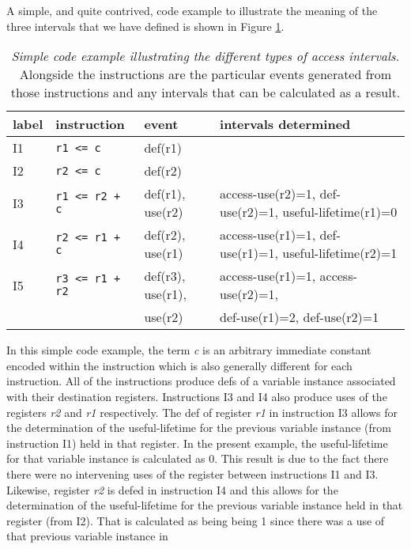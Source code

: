 \documentclass[10pt,dvips]{article}
\begin{document}
A simple, and quite contrived, 
code example to illustrate the meaning of the three
intervals that we have defined is shown in Figure \ref{tab:code1}.
%
\begin{table}
\begin{center}
\caption{{\em Simple code example illustrating the different types of
access intervals.}
Alongside the instructions are the particular events generated
from those instructions and any intervals that can be calculated
as a result.}
\label{tab:code1}
\vspace{+0.1in}
\begin{tabular}{l|l|l|l}
\hline 
label&instruction&event&intervals determined\\
\hline 
\hline 
I1&\verb"r1 <= c"&def(r1)& \\
\hline
I2&\verb"r2 <= c"&def(r2)& \\
\hline
I3&\verb"r1 <= r2 + c"&def(r1), use(r2)&
access-use(r2)=1, def-use(r2)=1, useful-lifetime(r1)=0\\
\hline
I4&\verb"r2 <= r1 + c"&def(r2), use(r1)&
access-use(r1)=1, def-use(r1)=1, useful-lifetime(r2)=1\\
\hline
I5&\verb"r3 <= r1 + r2"&def(r3), use(r1),&
access-use(r1)=1, access-use(r2)=1,\\
 & &use(r2)&def-use(r1)=2, def-use(r2)=1\\
\hline
\end{tabular}
\end{center}
\end{table}
%
In this simple code example, the term \textit{c} is an arbitrary
immediate constant encoded within the instruction which is
also generally different for each instruction.
All of the instructions produce defs of a variable instance
associated with their destination registers.
Instructions I3 and I4 also produce uses of the registers \textit{r2}
and \textit{r1} respectively.
The def of register \textit{r1} in instruction I3 allows for the
determination of the useful-lifetime for the previous variable
instance (from instruction I1) held in that register.  
In the present example, the useful-lifetime for that
variable instance is calculated as 0.
This result is due to the fact there there were no intervening uses
of the register between instructions I1 and I3.
Likewise, register \textit{r2} is defed in instruction I4 and this
allows for the determination of the useful-lifetime for the previous
variable instance held in that register (from I2).  
That is calculated as being
being 1 since there was a use of that previous variable instance in
\end{document}
